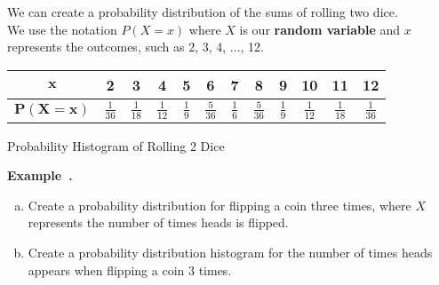\documentclass{article}
\newcounter{example}[section]
\newenvironment{example}[1][]{\refstepcounter{example}\par\medskip
   {\color{red}\textbf{Example~\theexample. #1}}}{\medskip}
\begin{document}
\vspace{0.5in}

We can create a probability distribution of the sums of rolling two dice. \newline\\	
We use the notation $P(X=x)$ where $X$ is our {\color{blue}\textbf{random variable}} and $x$ represents the outcomes, such as 2, 3, 4, ..., 12.

\vspace{0.25in}

\begin{center}
\setlength{\extrarowheight}{4pt}
\begin{tabular}{c|c|c|c|c|c|c|c|c|c|c|c}
    $\pmb{x}$ & 2 & 3 & 4 & 5 & 6 & 7 & 8 & 9 & 10 & 11 & 12 \\ \hline 
    $\pmb{P(X = x)}$ & $\frac{1}{36}$ & $\frac{1}{18}$ & $\frac{1}{12}$ & $\frac{1}{9}$ & $\frac{5}{36}$ & $\frac{1}{6}$ & $\frac{5}{36}$ & $\frac{1}{9}$ & $\frac{1}{12}$ & $\frac{1}{18}$ & $\frac{1}{36}$
\end{tabular}
\end{center}

\newpage 

Probability Histogram of Rolling 2 Dice
\begin{center}
\end{center}


\begin{example}
\begin{enumerate}[(a)]
\item Create a probability distribution for flipping a coin three times, where $X$ represents the number of times heads is flipped.
\vspace{1.5in}
\item Create a probability distribution histogram for the number of times heads appears when flipping a coin 3 times.	
\end{enumerate}
\end{example}
\end{document}
